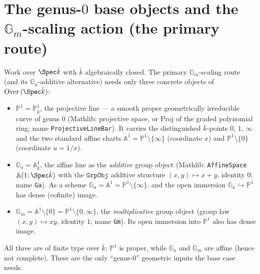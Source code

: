 \section{The genus-\(0\) base objects and the \(\mathbb G_m\)-scaling action (the primary route)}
\begin{definition}
  \label{def:genus0_base_objects}
  Work over \(\Spec \bar k\) with \(\bar k\) algebraically closed. The primary \(\mathbb G_m\)-scaling
  route (and its \(\mathbb G_a\)-additive alternative) needs only three concrete objects of
  \(\mathrm{Over}\,(\Spec \bar k)\):
  \begin{itemize}
    \item \(\mathbb P^1 = \mathbb P^1_{\bar k}\), the projective line --- a smooth proper
      geometrically irreducible curve of genus \(0\) (Mathlib: projective space, or \(\mathrm{Proj}\)
      of the graded polynomial ring; \lean name \texttt{ProjectiveLineBar}). It carries
      the distinguished \(\bar k\)-points \(0\), \(1\), \(\infty\) and the two standard affine charts
      \(\mathbb A^1 = \mathbb P^1 \setminus \{\infty\}\) (coordinate \(x\)) and
      \(\mathbb P^1 \setminus \{0\}\) (coordinate \(u = 1/x\)).
    \item \(\mathbb G_a = \mathbb A^1_{\bar k}\), the affine line as the \emph{additive} group object
      (Mathlib: \texttt{AffineSpace}\,\(\mathbb A(1; \Spec \bar k)\) with the \(\mathtt{GrpObj}\)
      additive structure \((x, y) \mapsto x + y\), identity \(0\); \lean name \texttt{Ga}).
      As a scheme \(\mathbb G_a = \mathbb A^1 = \mathbb P^1 \setminus \{\infty\}\), and the open
      immersion \(\mathbb G_a \hookrightarrow \mathbb P^1\) has dense (cofinite) image.
    \item \(\mathbb G_m = \mathbb A^1 \setminus \{0\} = \mathbb P^1 \setminus \{0, \infty\}\), the
      \emph{multiplicative} group object (group law \((x, y) \mapsto xy\), identity \(1\); \lean name
      \texttt{Gm}). Its open immersion into \(\mathbb P^1\) also has dense image.
  \end{itemize}
  All three are of finite type over \(\bar k\); \(\mathbb P^1\) is proper, while \(\mathbb G_a\) and
  \(\mathbb G_m\) are affine (hence not complete). These are the only ``genus-\(0\)'' geometric inputs
  the base case needs.
\end{definition}
